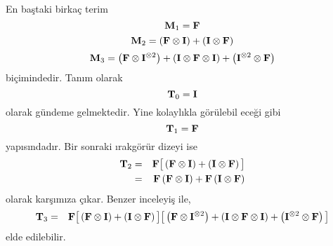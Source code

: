 \documentclass[a4paper,10pt]{article}
\begin{document}
En ba\c{s}taki birka\c{c} terim %
\begin{equation}
{\bf M}_1 = {\bf F}
\end{equation}
\begin{equation}
{\bf M}_2 = \left({\bf F}\otimes{\bf I}\right)
+\left({\bf I}\otimes{\bf F}\right)
\end{equation}
\begin{equation}
{\bf M}_3 = \left({\bf F}\otimes{\bf I}^{\otimes 2}\right)
+\left({\bf I}\otimes{\bf F}\otimes{\bf I}\right)
+\left({\bf I}^{\otimes 2}\otimes{\bf F}\right)
\end{equation}
bi\c{c}imindedir. Tan\i m olarak %
\begin{equation}
 {\bf T}_{0} =  {\bf I}
\end{equation}
olarak g\"undeme gelmektedir. Yi\-ne ko\-layl\i kla g\"or\"ulebil%
ece\u{g}i gibi %
\begin{equation}
 {\bf T}_{1} = {\bf F}
\end{equation}
yap\i s\i ndad\i r. Bir sonraki \i rakg\"or\"ur dizeyi ise %
\begin{eqnarray}
 {\bf T}_{2} &=& {\bf F}\big[\left({\bf F}\otimes{\bf I}\right)
+\left({\bf I}\otimes{\bf F}\right)\big] \nonumber\\
&=&{\bf F}\left({\bf F}\otimes{\bf I}\right)+
{\bf F}\left({\bf I}\otimes{\bf F}\right)
\label{eq:aqweq}
\end{eqnarray}
olarak kar\c{s}\i m\i za \c{c}\i kar. Benzer inceleyi\c{s} ile, %
\begin{eqnarray}
{\bf T}_{3} &=& {\bf F} \big[\left({\bf F}\otimes{\bf I}\right)
+\left({\bf I}\otimes{\bf F}\right)\big]
\big[ \left({\bf F}\otimes{\bf I}^{\otimes 2}\right)
+\left({\bf I}\otimes{\bf F}\otimes{\bf I}\right)
+\left({\bf I}^{\otimes 2}\otimes{\bf F}\right) \big]
\end{eqnarray}
elde edilebilir.
\end{document}

